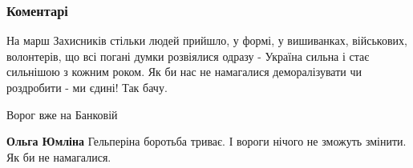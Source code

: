  
 
 
 
 
\subsubsection{Коментарі}
\label{sec:24_08_2021.fb.burko_roman.1.nezalezhnist_skabeeva.cmt}

\begin{itemize}

 

На марш Захисників стільки людей прийшло, у формі, у вишиванках, військових,
волонтерів, що всі погані думки розвіялися одразу - Україна сильна і стає
сильнішою з кожним роком. Як би нас не намагалися деморалізувати чи роздробити
- ми єдині! Так бачу.




 

Ворог вже на Банковій

\begin{itemize}
 
\textbf{Ольга Юмліна} Гельперіна боротьба триває. І вороги нічого не зможуть змінити. Як би не намагалися.
\end{itemize}

 

\end{itemize}
